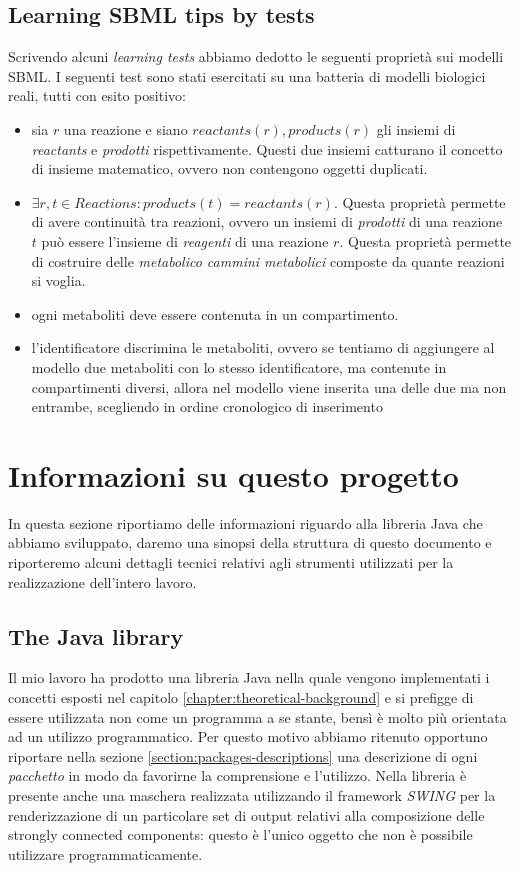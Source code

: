 \subsection{Learning SBML tips by tests}

Scrivendo alcuni \emph{learning tests} abbiamo dedotto le seguenti
propriet\`a sui modelli SBML. I seguenti test sono stati esercitati su
una batteria di modelli biologici reali, tutti con esito positivo:
\begin{itemize}
\item sia $r$ una reazione e siano $reactants(r), products(r)$ gli
  insiemi di \emph{reactants} e \emph{prodotti}
  rispettivamente. Questi due insiemi catturano il concetto di insieme
  matematico, ovvero non contengono oggetti duplicati.
\item $\exists r,t \in Reactions: products(t) = reactants(r)$. Questa
  propriet\`a permette di avere continuit\`a tra reazioni, ovvero un
  insiemi di \emph{prodotti} di una reazione $t$ pu\`o essere
  l'insieme di \emph{reagenti} di una reazione $r$. Questa
  propriet\`a permette di costruire delle \emph{metabolico cammini metabolici}
  composte da quante reazioni si voglia.
\item ogni metaboliti deve essere contenuta in un compartimento.
\item l'identificatore discrimina le metaboliti, ovvero se tentiamo di
  aggiungere al modello due metaboliti con lo stesso identificatore, ma
  contenute in compartimenti diversi, allora nel modello viene
  inserita una delle due ma non entrambe, scegliendo in ordine
  cronologico di inserimento
\end{itemize}

\section{Informazioni su questo progetto}
In questa sezione riportiamo delle informazioni riguardo alla libreria
Java che abbiamo sviluppato, daremo una sinopsi della struttura di
questo documento e riporteremo alcuni dettagli tecnici relativi agli
strumenti utilizzati per la realizzazione dell'intero lavoro.

\subsection{The Java library}
Il mio lavoro ha prodotto una libreria Java nella quale vengono
implementati i concetti esposti nel capitolo
\ref{chapter:theoretical-background} e si prefigge di essere
utilizzata non come un programma a se stante, bens\`i \`e molto pi\`u
orientata ad un utilizzo programmatico. Per questo motivo abbiamo
ritenuto opportuno riportare nella sezione
\ref{section:packages-descriptions} una descrizione di ogni
\emph{pacchetto} in modo da favorirne la comprensione e
l'utilizzo. Nella libreria \`e presente anche una maschera realizzata
utilizzando il framework \emph{SWING} per la renderizzazione di un
particolare set di output relativi alla composizione delle strongly
connected components: questo \`e l'unico oggetto che non \`e possibile
utilizzare programmaticamente.

